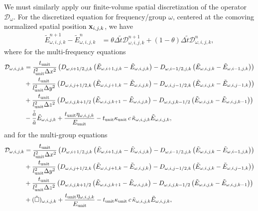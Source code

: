 \documentclass[10pt]{article}
\renewcommand{\(}{\left(}
\renewcommand{\)}{\right)}
\newcommand{\xvec}{{\bf x}}
\newcommand{\adot}{\dot{a}}
\newcommand{\mD}{{\mathcal D}}
\newcommand{\Lunit}{l_{\text{unit}}}
\newcommand{\Tunit}{t_{\text{unit}}}
\newcommand{\Eunit}{E_{\text{unit}}}
\newcommand{\Kunit}{\kappa_{\text{unit}}}
\newcommand{\tK}{\tilde{\kappa}}
\newcommand{\tT}{\tilde{t}}
\newcommand{\tE}{\tilde{E}}
\newcommand{\tA}{\tilde{a}}
\newcommand{\tAdot}{\tilde{\adot}}
\begin{document}
We must similarly apply our finite-volume spatial discretization of
the operator $\mD_{\omega}$.  For the discretized equation for
frequency/group $\omega$, centered at the comoving normalized spatial
position $\xvec_{i,j,k}$, we have  
\begin{align}
  \label{eq:mgfld_discrete}
  \tE_{\omega,i,j,k}^{n+1} - \tE_{\omega,i,j,k}^n &= \theta\Delta \tT \mD_{\omega,i,j,k}^{n+1} 
    + (1-\theta)\Delta \tT \mD_{\omega,i,j,k}^{n},
\end{align}
where for the multi-frequency equations
\begin{align}
  \label{eq:discrete_multifrequency_operator}
  \mD_{\omega,i,j,k} &= 
       \frac{\Tunit}{\Lunit^2 \Delta x^2}\(D_{\omega,i+1/2,j,k}\(\tE_{\omega,i+1,j,k} - \tE_{\omega,i,j,k}\) - D_{\omega,i-1/2,j,k}\(\tE_{\omega,i,j,k} - \tE_{\omega,i-1,j,k}\)\) \\
 \notag
    &+ \frac{\Tunit}{\Lunit^2 \Delta y^2}\(D_{\omega,i,j+1/2,k}\(\tE_{\omega,i,j+1,k} - \tE_{\omega,i,j,k}\) - D_{\omega,i,j-1/2,k}\(\tE_{\omega,i,j,k} - \tE_{\omega,i,j-1,k}\)\) \\
  \notag
    &+ \frac{\Tunit}{\Lunit^2 \Delta z^2}\(D_{\omega,i,j,k+1/2}\(\tE_{\omega,i,j,k+1} - \tE_{\omega,i,j,k}\) - D_{\omega,i,j,k-1/2}\(\tE_{\omega,i,j,k} - \tE_{\omega,i,j,k-1}\)\) \\
  \notag
    &- \frac{\tAdot}{\tA}\tE_{\omega,i,j,k} + \frac{\Tunit \eta_{\omega,i,j,k}}{\Eunit} 
     - \Tunit \Kunit\, c\, \tK_{\omega,i,j,k} \tE_{\omega,i,j,k},
\end{align}
and for the multi-group equations
\begin{align}
  \label{eq:discrete_multigroup_operator}
  \mD_{\omega,i,j,k} &= 
       \frac{\Tunit}{\Lunit^2 \Delta x^2}\(D_{\omega,i+1/2,j,k}\(\tE_{\omega,i+1,j,k} - \tE_{\omega,i,j,k}\) - D_{\omega,i-1/2,j,k}\(\tE_{\omega,i,j,k} - \tE_{\omega,i-1,j,k}\)\) \\
 \notag
    &+ \frac{\Tunit}{\Lunit^2 \Delta y^2}\(D_{\omega,i,j+1/2,k}\(\tE_{\omega,i,j+1,k} - \tE_{\omega,i,j,k}\) - D_{\omega,i,j-1/2,k}\(\tE_{\omega,i,j,k} - \tE_{\omega,i,j-1,k}\)\) \\
  \notag
    &+ \frac{\Tunit}{\Lunit^2 \Delta z^2}\(D_{\omega,i,j,k+1/2}\(\tE_{\omega,i,j,k+1} - \tE_{\omega,i,j,k}\) - D_{\omega,i,j,k-1/2}\(\tE_{\omega,i,j,k} - \tE_{\omega,i,j,k-1}\)\) \\
  \notag
    &+ (\tilde{\square})_{\omega,i,j,k} + \frac{\Tunit \eta_{\omega,i,j,k}}{\Eunit} 
     - \Tunit \Kunit\, c\, \tK_{\omega,i,j,k} \tE_{\omega,i,j,k},
\end{align}
\end{document}
